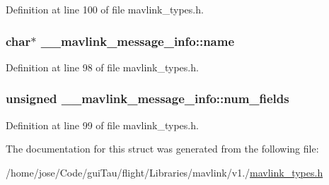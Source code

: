 Definition at line 100 of file mavlink\-\_\-types.\-h.

\hypertarget{struct____mavlink__message__info_a5e8b48c51cb8bc44bd844d1c3049ee32}{
\subsubsection[{name}]{ char$\ast$ \-\_\-\-\_\-mavlink\-\_\-message\-\_\-info\-::name}}\label{struct____mavlink__message__info_a5e8b48c51cb8bc44bd844d1c3049ee32}


Definition at line 98 of file mavlink\-\_\-types.\-h.

\hypertarget{struct____mavlink__message__info_a0c343bcc1f27884e8c2ab875e7efc2e5}{
\subsubsection[{num\-\_\-fields}]{\setlength{\rightskip}{0pt plus 5cm}unsigned \-\_\-\-\_\-mavlink\-\_\-message\-\_\-info\-::num\-\_\-fields}}\label{struct____mavlink__message__info_a0c343bcc1f27884e8c2ab875e7efc2e5}


Definition at line 99 of file mavlink\-\_\-types.\-h.



The documentation for this struct was generated from the following file\-:\begin{DoxyCompactItemize}
\item 
/home/jose/\-Code/gui\-Tau/flight/\-Libraries/mavlink/v1./\hyperlink{mavlink__types_8h}{mavlink\-\_\-types.\-h}\end{DoxyCompactItemize}
